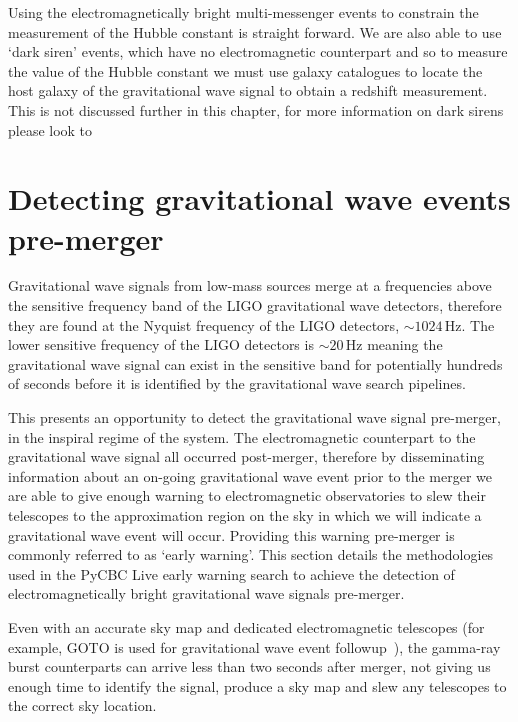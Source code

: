 Using the electromagnetically bright multi-messenger events to constrain the measurement of the Hubble constant is straight forward. We are also able to use `dark siren' events, which have no electromagnetic counterpart and so to measure the value of the Hubble constant we must use galaxy catalogues to locate the host galaxy of the gravitational wave signal to obtain a redshift measurement. This is not discussed further in this chapter, for more information on dark sirens please look to~\cite{DES:2019, Dalang_dark_sirens:2023}

\section{\label{6:sec:early-warning-search}Detecting gravitational wave events pre-merger}

Gravitational wave signals from low-mass sources merge at a frequencies above the sensitive frequency band of the LIGO gravitational wave detectors, therefore they are found at the Nyquist frequency of the LIGO detectors, ${\sim}1024 \, \text{Hz}$. The lower sensitive frequency of the LIGO detectors is ${\sim}20 \, \text{Hz}$ meaning the gravitational wave signal can exist in the sensitive band for potentially hundreds of seconds before it is identified by the gravitational wave search pipelines.

This presents an opportunity to detect the gravitational wave signal pre-merger, in the inspiral regime of the system. The electromagnetic counterpart to the gravitational wave signal all occurred post-merger, therefore by disseminating information about an on-going gravitational wave event prior to the merger we are able to give enough warning to electromagnetic observatories to slew their telescopes to the approximation region on the sky in which we will indicate a gravitational wave event will occur. Providing this warning pre-merger is commonly referred to as `early warning'. This section details the methodologies used in the PyCBC Live early warning search to achieve the detection of electromagnetically bright gravitational wave signals pre-merger.

Even with an accurate sky map and dedicated electromagnetic telescopes (for example, GOTO is used for gravitational wave event followup~\cite{GOTO:2020}), the gamma-ray burst counterparts can arrive less than two seconds after merger, not giving us enough time to identify the signal, produce a sky map and slew any telescopes to the correct sky location.

